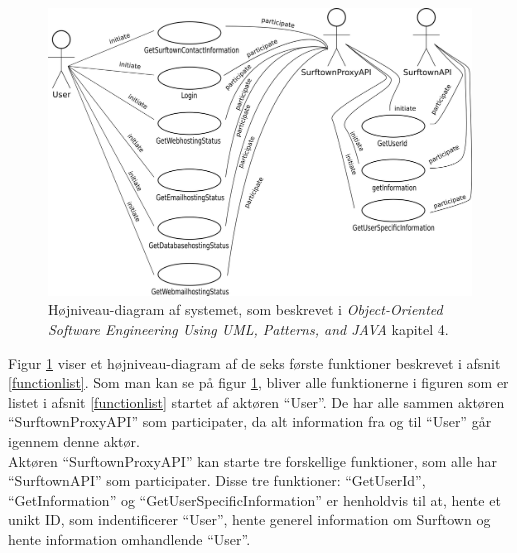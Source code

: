 \documentclass[12pt]{article}
\begin{document}
\begin{figure}[!h]
	\centering
	\includegraphics[width=13cm]{high_level_diagramv2.png}
	\caption{Højniveau-diagram af systemet, som beskrevet i \emph{Object-Oriented Software Engineering Using UML, Patterns, and JAVA}\cite{OOSE} kapitel 4.}
	\label{highleveldiagram}
\end{figure}


Figur \ref{highleveldiagram} viser et højniveau-diagram af de seks første funktioner beskrevet i afsnit \ref{functionlist}. Som man kan se på figur \ref{highleveldiagram}, bliver alle funktionerne i figuren som er listet i afsnit \ref{functionlist} startet af aktøren ``User''. De har alle sammen aktøren ``SurftownProxyAPI'' som participater, da alt information fra og til ``User'' går igennem denne aktør.\\Aktøren ``SurftownProxyAPI'' kan starte tre forskellige funktioner, som alle har ``SurftownAPI'' som participater. Disse tre funktioner: ``GetUserId'', ``GetInformation'' og ``GetUserSpecificInformation'' er henholdvis til at, hente et unikt ID, som indentificerer ``User'', hente generel information om Surftown og hente information omhandlende ``User''. 
\end{document}
